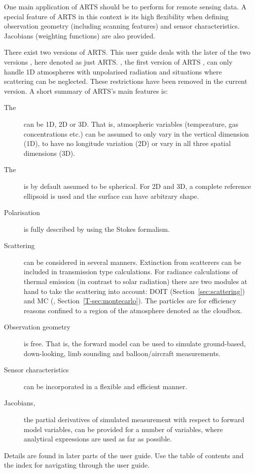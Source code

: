 One main application of ARTS should be to perform  for
remote sensing data. A special feature of ARTS in this context is its high
flexibility when defining observation geometry (including scanning features)
and sensor characteristics. Jacobians (weighting functions) are also provided.

There exist two versions of ARTS. This user guide deals with the later
of the two versions \citep{eriksson:arts2:11}, here denoted as just
ARTS. , the first version of ARTS
\citep{buehler:artst:05}, can only handle 1D atmospheres with
unpolarised radiation and situations where scattering can be
neglected.  These restrictions have been removed in the current
version. A short summary of ARTS's main features is:
\begin{description}
\item[The ] can be 1D, 2D or 3D. That is, atmospheric
  variables (temperature, gas concentrations etc.) can be assumed to
  only vary in the vertical dimension (1D), to have no longitude
  variation (2D) or vary in all three spatial dimensions (3D).
\item[The ] is by default assumed to be spherical. For 2D
  and 3D, a complete reference ellipsoid is used and the surface can have
  arbitrary shape.
\item[Polarisation] is fully described by using the Stokes formalism.
\item[Scattering] can be considered in several manners. Extinction from
  scatterers can be included in transmission type calculations.
  For radiance calculations of thermal emission (in contrast to solar radiation)
  there are two modules at hand to take the scattering into account: DOIT
  (Section~\ref{sec:scattering}) and MC (\theory, Section~\ref{T-sec:montecarlo}).
  The  particles are
  for efficiency reasons confined to a region of the atmosphere denoted as the
  cloudbox.
\item[Observation geometry] is free. That is, the forward model can be
  used to simulate ground-based, down-looking, limb sounding and
  balloon/aircraft measurements.
\item[Sensor characteristics] can be incorporated in a flexible and
  efficient manner.
\item[Jacobians,] the partial derivatives of simulated measurement
  with respect to forward model variables, can be provided for a
  number of variables, where analytical expressions are used as far as
  possible.
\end{description}
Details are found in later parts of the user guide. Use the table of
contents and the index for navigating through the user guide.



